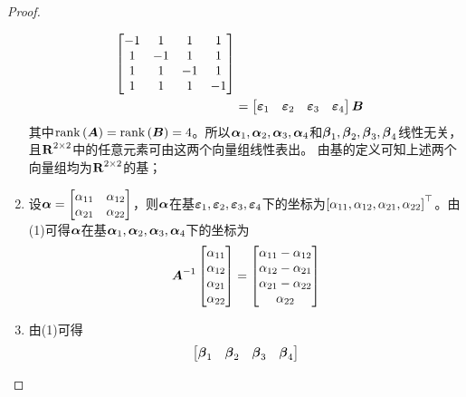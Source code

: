 \begin{proof}
\begin{enumerate}
{\begin{align*}
                  \begin{bmatrix}
                      -1 & 1  & 1  & 1  \\
                      1  & -1 & 1  & 1  \\
                      1  & 1  & -1 & 1  \\
                      1  & 1  & 1  & -1
                  \end{bmatrix}                                                                \\
                   & =\begin{bmatrix}\boldsymbol{\varepsilon}_1&\boldsymbol{\varepsilon}_2&\boldsymbol{\varepsilon}_3&\boldsymbol{\varepsilon}_4\end{bmatrix}\boldsymbol{B}
              \end{align*}
              其中\(\mathrm{rank}\left( \boldsymbol{A} \right)=\mathrm{rank}\left( \boldsymbol{B} \right)=4\)。所以\(\boldsymbol{\alpha}_1,\boldsymbol{\alpha}_2,\boldsymbol{\alpha}_3,\boldsymbol{\alpha}_4\)和\(\boldsymbol{\beta}_1,\boldsymbol{\beta}_2,\boldsymbol{\beta}_3,\boldsymbol{\beta}_4\)线性无关，且\(\boldsymbol{\mathrm{R}}^{2\times2}\)中的任意元素可由这两个向量组线性表出。
              由基的定义可知上述两个向量组均为\(\boldsymbol{\mathrm{R}}^{2\times2}\)的基；
              }
        \item {
              设\(\boldsymbol{\alpha}=\begin{bmatrix}\alpha_{11}&\alpha_{12}\\\alpha_{21}&\alpha_{22}\end{bmatrix}\)，则\(\boldsymbol{\alpha}\)在基\(\boldsymbol{\varepsilon}_1,\boldsymbol{\varepsilon}_2,\boldsymbol{\varepsilon}_3,\boldsymbol{\varepsilon}_4\)下的坐标为\(\left[ \alpha_{11},\alpha_{12},\alpha_{21},\alpha_{22} \right]^\top\)。由(1)可得\(\boldsymbol{\alpha}\)在基\(\boldsymbol{\alpha}_1,\boldsymbol{\alpha}_2,\boldsymbol{\alpha}_3,\boldsymbol{\alpha}_4\)下的坐标为
              \begin{equation*}
                  {\boldsymbol{A}}^{-1}\begin{bmatrix}\alpha_{11}\\\alpha_{12}\\\alpha_{21}\\\alpha_{22}\end{bmatrix}=
                  \begin{bmatrix}\alpha_{11}-\alpha_{12}\\\alpha_{12}-\alpha_{21}\\\alpha_{21}-\alpha_{22}\\\alpha_{22}\end{bmatrix}
              \end{equation*}
              }
        \item {
              由(1)可得
              \begin{align*}
                  \begin{bmatrix}\vecbeta_1&\vecbeta_2&\vecbeta_3&\vecbeta_4\end{bmatrix}

\end{align*}}
\end{enumerate}
\end{proof}
